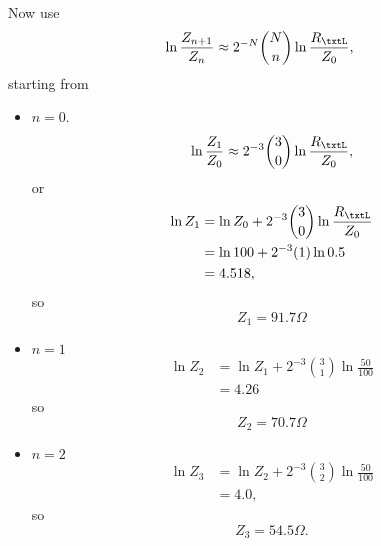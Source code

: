 {Now use
\begin{equation}\label{eqn:uwavesDeck7MultisectionTransformersCore:940}
\ln \frac{Z_{n+1}}{Z_n}
\approx 2^{-N} \binom{N}{n} \ln \frac{R_\txtL}{Z_0},
\end{equation}
starting from
\begin{itemize}
\item \( n = 0 \).
\begin{equation}\label{eqn:uwavesDeck7MultisectionTransformersCore:480}
\ln \frac{Z_{1}}{Z_0} \approx 2^{-3} \binom{3}{0} \ln \frac{R_\txtL}{Z_0},
\end{equation}
or
\begin{equation}\label{eqn:uwavesDeck7MultisectionTransformersCore:500}
\begin{aligned}
\ln Z_{1}
&= \ln Z_0 + 2^{-3} \binom{3}{0} \ln \frac{R_\txtL}{Z_0}
\\ &= \ln 100 + 2^{-3} (1) \ln 0.5
\\ &= 4.518,
\end{aligned}
\end{equation}
so
\begin{equation}\label{eqn:uwavesDeck7MultisectionTransformersCore:520}
Z_1 = 91.7 \Omega
\end{equation}
\item \( n = 1 \)
\begin{equation}\label{eqn:uwavesDeck7MultisectionTransformersCore:540}
\begin{aligned}
\ln Z_{2}
&= \ln Z_1 + 2^{-3} \binom{3}{1} \ln \frac{50}{100} \\ &= 4.26
\end{aligned}
\end{equation}
so
\begin{equation}\label{eqn:uwavesDeck7MultisectionTransformersCore:560}
Z_2 = 70.7 \Omega
\end{equation}
\item \( n = 2 \)
\begin{equation}\label{eqn:uwavesDeck7MultisectionTransformersCore:580}
\begin{aligned}
\ln Z_{3} &= \ln Z_2 + 2^{-3} \binom{3}{2} \ln \frac{50}{100} \\ &= 4.0,
\end{aligned}
\end{equation}
so
\begin{equation}\label{eqn:uwavesDeck7MultisectionTransformersCore:600}
Z_3 = 54.5 \Omega.
\end{equation}
\end{itemize}

}
